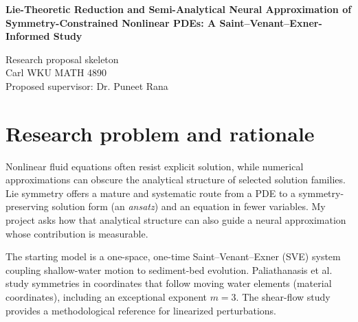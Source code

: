 \documentclass[12pt,a4paper]{article}
\begin{document}
\begin{center}
\textbf{Lie-Theoretic Reduction and Semi-Analytical Neural Approximation of Symmetry-Constrained Nonlinear PDEs: A Saint--Venant--Exner-Informed Study}

Research proposal skeleton\\
{Carl} \quad WKU MATH 4890\\
Proposed supervisor: Dr. Puneet Rana
\end{center}

\section{Research problem and rationale}
Nonlinear fluid equations often resist explicit solution, while numerical approximations can obscure the analytical structure of selected solution families. Lie symmetry offers a mature and systematic route from a PDE to a symmetry-preserving solution form (an \emph{ansatz}) and an equation in fewer variables. My project asks how that analytical structure can also guide a neural approximation whose contribution is measurable.

The starting model is a one-space, one-time Saint--Venant--Exner (SVE) system coupling shallow-water motion to sediment-bed evolution. Paliathanasis et al.\ \cite{sve} study symmetries in coordinates that follow moving water elements (material coordinates), including an exceptional exponent $m=3$. The shear-flow study \cite{shear} provides a methodological reference for linearized perturbations.
\end{document}

